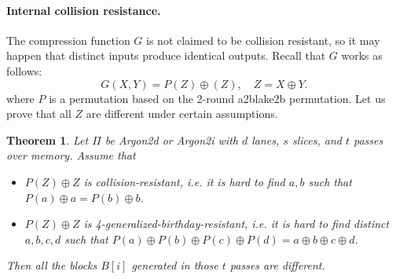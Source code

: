 \documentclass[a4paper]{article}
\newtheorem{theorem}{Theorem}
\begin{document}
 \paragraph{Internal collision resistance.} The compression function $G$ is not claimed to be collision resistant, so it may happen that distinct inputs produce identical outputs. Recall
that $G$ works as follows:
$$
G(X,Y) = P(Z)\oplus (Z), \quad Z = X\oplus Y.
$$
where $P$ is a permutation based on the 2-round a2blake2b permutation. Let us prove that all $Z$ are different under certain assumptions.
\begin{theorem}
  Let $\Pi$ be \textsf{Argon2d} or \textsf{Argon2i} with $d$ lanes, $s$ slices, and $t$ passes over memory. Assume that
   \begin{itemize}
     \item $P(Z)\oplus Z$ is collision-resistant, i.e. it is hard to find $a,b$ such that $P(a)\oplus a = P(b)\oplus b$.
     \item $P(Z)\oplus Z$ is 4-generalized-birthday-resistant, i.e. it is hard to find distinct $a,b,c,d$ such that $P(a)\oplus P(b)\oplus P(c)\oplus P(d) = a\oplus b\oplus c \oplus d$.
   \end{itemize}Then all the blocks $B[i]$ generated in those $t$ passes are different.
\end{theorem}
\end{document}
